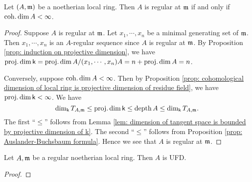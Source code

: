 
    \begin{theorem}\label{thm: regularity and finite cohomological dimension}
        Let \((A,{\mathfrak{m}})\) be a noetherian local ring.
        Then \(A\) is regular at \({\mathfrak{m}}\) if and only if \(\operatorname{coh.dim} A < \infty\).
    \end{theorem}
    \begin{proof}
        Suppose \(A\) is regular at \({\mathfrak{m}}\).
        Let \(x_1,\cdots,x_n\) be a minimal generating set of \({\mathfrak{m}}\).
        Then \(x_1,\cdots,x_n\) is an \(A\)-regular sequence since \(A\) is regular at \({\mathfrak{m}}\).
        By Proposition \ref{prop: induction on projective dimension}, we have 
        \( \operatorname{proj.dim} {\mathsf{k}} = \operatorname{proj.dim} A/(x_1,\cdots,x_n)A = n + \operatorname{proj.dim} A = n\).

        Conversely, suppose \(\operatorname{coh.dim} A < \infty\).
        Then by Proposition \ref{prop: cohomological dimension of local ring is projective dimension of residue field}, we have \(\operatorname{proj.dim} {\mathsf{k}} < \infty\).
        We have 
        \[ \dim_{\mathsf{k}} T_{A,{\mathfrak{m}}} \leq \operatorname{proj.dim} {\mathsf{k}} \leq \operatorname{depth} A \leq \dim_{\mathsf{k}} T_{A,{\mathfrak{m}}}. \]
        The first ``\(\leq\)'' follows from Lemma \ref{lem: dimension of tangent space is bounded by projective dimension of k}.
        The second ``\(\leq\)'' follows from Proposition \ref{prop: Auslander-Buchsbaum formula}.
        Hence we see that \(A\) is regular at \({\mathfrak{m}}\).
    \end{proof}

    \begin{theorem}\label{thm: regular local ring is UFD}
        Let \(A,{\mathfrak{m}}\) be a regular noetherian local ring.
        Then \(A\) is UFD.
    \end{theorem}
    \begin{proof}
    \end{proof}